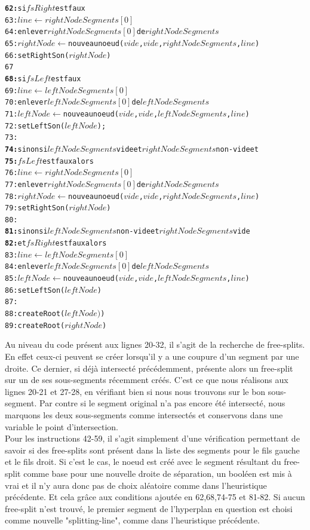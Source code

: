 \documentclass[11pt,a4paper]{article}
\theoremstyle{definition}
\theoremstyle{remark}
\begin{document}
\begin{alltt}
\textbf{62:}	    si \(fsRight\) est faux
63:       \(line \leftarrow rightNodeSegments[0]\)
64:       enlever \(rightNodeSegments[0]\) de \(rightNodeSegments\)
65:       \(rightNode \leftarrow\) nouveau noeud (\(vide\), \(vide\), \(rightNodeSegments\), \(line\))
66:       setRightSon(\(rightNode\))
67
\textbf{68:}	    si \(fsLeft\) est faux
69:       \(line \leftarrow leftNodeSegments[0]\)
70:       enlever \(leftNodeSegments[0]\) de \(leftNodeSegments\)
71:       \(leftNode \leftarrow\) nouveau noeud (\(vide\), \(vide\), \(leftNodeSegments\), \(line\))
72:       setLeftSon(\(leftNode\));
73:     
\textbf{74:}   sinon si \(leftNodeSegments\) vide et \(rightNodeSegments\) non-vide et
\textbf{75:}   \(fsLeft\) est faux alors
76:     \(line \leftarrow rightNodeSegments[0]\)
77:     enlever \(rightNodeSegments[0]\) de \(rightNodeSegments\)
78:     \(rightNode \leftarrow \) nouveau noeud (\(vide\), \(vide\), \(rightNodeSegments\), \(line\))
79:     setRightSon(\(rightNode\))
80:    
\textbf{81:}   sinon si \(leftNodeSegments\) non-vide et \(rightNodeSegments\) vide 
\textbf{82:}   et \(fsRight\) est faux alors
83:     \(line \leftarrow leftNodeSegments[0]\)
84:     enlever \(leftNodeSegments[0]\) de \(leftNodeSegments\)
85:     \(leftNode \leftarrow \) nouveau noeud (\(vide\), \(vide\), \(leftNodeSegments\), \(line\))
86:     setLeftSon(\(leftNode\))
87:     
88:   createRoot(\(leftNode)\))
89:   createRoot(\(rightNode\))
\end{alltt}

Au niveau du code présent aux lignes 20-32, il s'agit de la recherche de free-splits. En effet ceux-ci peuvent se créer lorsqu'il y a une coupure d'un segment par une droite. Ce dernier, si déjà intersecté précédemment, présente alors un free-split sur un de ses sous-segments récemment créés. C'est ce que nous réalisons aux lignes 20-21 et 27-28, en vérifiant bien si nous nous trouvons sur le bon sous-segment. Par contre si le segment original n'a pas encore été intersecté, nous marquons les deux sous-segments comme intersectés et conservons dans une variable le point d'intersection. \\

Pour les instructions 42-59, il s'agit simplement d'une vérification permettant de savoir si des free-splits sont présent dans la liste des segments pour le fils gauche et le fils droit. Si c'est le cas, le noeud est créé avec le segment résultant du free-split comme base pour une nouvelle droite de séparation, un booléen est mis à vrai et il n'y aura donc pas de choix aléatoire comme dans l'heuristique précédente. Et cela grâce aux conditions ajoutée en 62,68,74-75 et 81-82. Si aucun free-split n'est trouvé, le premier segment de l'hyperplan en question est choisi comme nouvelle "splitting-line", comme dans l'heuristique précédente. 
\end{document}
